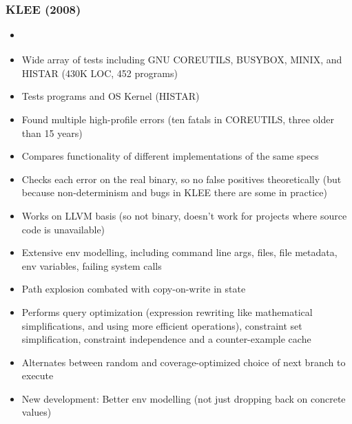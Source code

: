 \documentclass[12pt]{article}
\begin{document}
\subsubsection{KLEE (2008)}
\begin{itemize}
    \item \cite{KLEE}
    \item Wide array of tests including GNU COREUTILS, BUSYBOX, MINIX, and HISTAR (430K LOC, 452 programs)
    \item Tests programs and OS Kernel (HISTAR)
    \item Found multiple high-profile errors (ten fatals in COREUTILS, three older than 15 years)
    \item Compares functionality of different implementations of the same specs
    \item Checks each error on the real binary, so no false positives theoretically (but because non-determinism and bugs in KLEE there are some in practice)
    \item Works on LLVM basis (so not binary, doesn't work for projects where source code is unavailable)
    \item Extensive env modelling, including command line args, files, file metadata, env variables, failing system calls
    \item Path explosion combated with copy-on-write in state
    \item Performs query optimization (expression rewriting like mathematical simplifications, and using more efficient operations), constraint set simplification, constraint independence and a counter-example cache
    \item Alternates between random and coverage-optimized choice of next branch to execute
    \item New development: Better env modelling (not just dropping back on concrete values)
\end{itemize}
\end{document}
